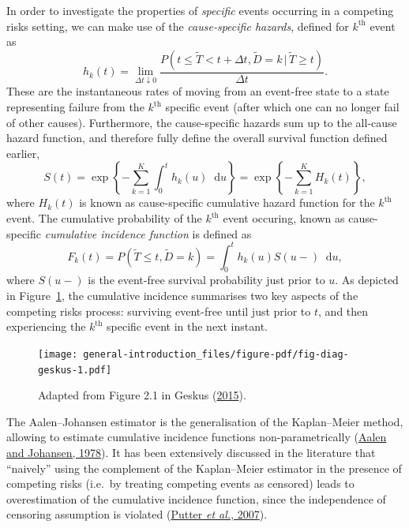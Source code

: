 \documentclass[
  letterpaper,
  DIV=11,
  numbers=noendperiod]{scrreprt}
\newcommand{\given}{\,|\,}
\newcommand\diff{\mathop{}\!\mathrm{d}}
\begin{document}
In order to investigate the properties of \emph{specific} events
occurring in a competing risks setting, we can make use of the
\emph{cause-specific hazards}, defined for \(k^{\text{th}}\) event as\\
\[
    h_k(t) = \lim_{\Delta t \downarrow 0} \frac{P(t \leq \tilde{T} < t + \Delta t, \tilde{D} = k \given \tilde{T} \geq t)}{\Delta t}.
\] These are the instantaneous rates of moving from an event-free state
to a state representing failure from the \(k^{\text{th}}\) specific
event (after which one can no longer fail of other causes). Furthermore,
the cause-specific hazards sum up to the all-cause hazard function, and
therefore fully define the overall survival function defined earlier, \[
S(t) = \exp \left\{ - \sum_{k = 1}^{K} \int_{0}^{t} h_k(u)\diff u \right\} = \exp \left\{ - \sum_{k = 1}^{K} H_k(t) \right\},
\] where \(H_k(t)\) is known as cause-specific cumulative hazard
function for the \(k^{\text{th}}\) event. The cumulative probability of
the \(k^{\text{th}}\) event occuring, known as cause-specific
\emph{cumulative incidence function} is defined as \[
    F_k(t) = P(\tilde{T} \leq t, \tilde{D} = k) = \int_{0}^{t}h_k(u)S(u-)\diff u,
\] where \(S(u-)\) is the event-free survival probability just prior to
\(u\). As depicted in Figure~\ref{fig-diag-geskus}, the cumulative
incidence summarises two key aspects of the competing risks process:
surviving event-free until just prior to \(t\), and then experiencing
the \(k^{\text{th}}\) specific event in the next instant.

\begin{figure}

{\centering \texttt{[image: general-introduction\_files/figure-pdf/fig-diag-geskus-1.pdf]}

}

\caption{\label{fig-diag-geskus}Adapted from Figure 2.1 in Geskus
(\protect\hyperlink{ref-geskus2015data}{2015}).}

\end{figure}

The Aalen--Johansen estimator is the generalisation of the Kaplan--Meier
method, allowing to estimate cumulative incidence functions
non-parametrically
(\protect\hyperlink{ref-aalenEmpiricalTransitionMatrix1978}{Aalen and
Johansen, 1978}). It has been extensively discussed in the literature
that ``naively'' using the complement of the Kaplan--Meier estimator in
the presence of competing risks (i.e.~by treating competing events as
censored) leads to overestimation of the cumulative incidence function,
since the independence of censoring assumption is violated
(\protect\hyperlink{ref-putterTutorialBiostatisticsCompeting2007}{Putter
\emph{et al.}, 2007}).
\end{document}
